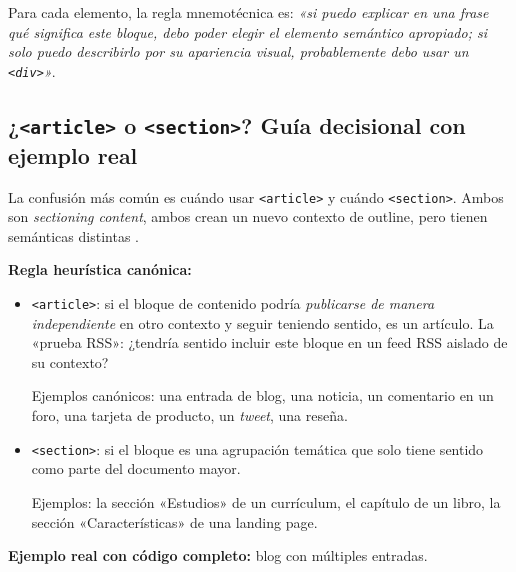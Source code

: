 Para cada elemento, la regla mnemotécnica es: \emph{«si puedo
explicar en una frase qué significa este bloque, debo poder elegir
el elemento semántico apropiado; si solo puedo describirlo por su
apariencia visual, probablemente debo usar un \texttt{<div>}»}.

\subsection{¿\texttt{<article>} o \texttt{<section>}? Guía decisional con ejemplo real}

La confusión más común es cuándo usar \texttt{<article>} y cuándo
\texttt{<section>}. Ambos son \emph{sectioning content}, ambos
crean un nuevo contexto de outline, pero tienen semánticas distintas
\cite{lawson2011html5,robbins2018learning}.

\textbf{Regla heurística canónica:}

\begin{itemize}
\item \texttt{<article>}: si el bloque de contenido podría
\emph{publicarse de manera independiente} en otro contexto y seguir
teniendo sentido, es un artículo. La «prueba RSS»: ¿tendría sentido
incluir este bloque en un feed RSS aislado de su contexto?

Ejemplos canónicos: una entrada de blog, una noticia, un comentario
en un foro, una tarjeta de producto, un \emph{tweet}, una reseña.

\item \texttt{<section>}: si el bloque es una agrupación temática
que solo tiene sentido como parte del documento mayor.

Ejemplos: la sección «Estudios» de un currículum, el capítulo de un
libro, la sección «Características» de una landing page.
\end{itemize}

\textbf{Ejemplo real con código completo:} blog con múltiples entradas.

